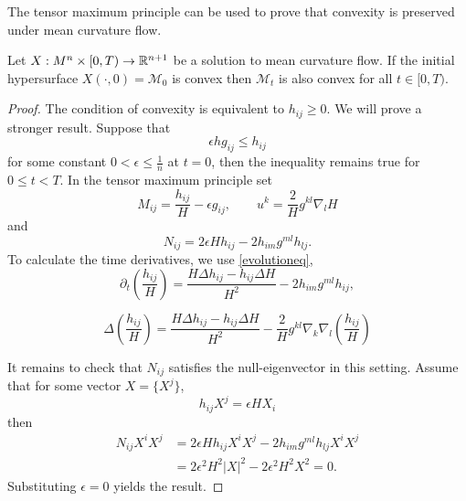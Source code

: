 The tensor maximum principle can be used to prove that convexity is preserved under mean curvature flow. 

\begin{lemma}
    Let $ X: M^{n} \times [0, T) \to \mathbb{R}^{n+1} $ be a solution to mean curvature flow. If the initial hypersurface $ X(\cdot, 0) = \mathcal{M}_{0}$ is convex then $ \mathcal{M}_{t} $ is also convex for all $ t \in [0,T) $.
\end{lemma}
\begin{proof}
    The condition of convexity is equivalent to $ h_{ij} \ge 0 $. We will prove a stronger result. Suppose that 
    \[ \epsilon h g_{ij} \le h_{ij} \]
    for some constant $ 0 < \epsilon \le \frac{1}{n} $ at $ t = 0 $, then the inequality remains true for $ 0 \le t <T $. In the tensor maximum principle set 
    \[ M_{ij} = \frac{h_{ij}}{H} - \epsilon g_{ij}, \qquad u^{k} = \frac{2}{H}g^{kl} \nabla_{l}H \]
    and 
    \[ N_{ij} = 2 \epsilon H h_{ij} - 2h_{im}g^{ml}h_{lj}. \]
    To calculate the time derivatives, we use \cref{evolutioneq}, 
    \[ \partial_{t}\left( \frac{h_{ij}}{H} \right) = \frac{H \Delta h_{ij}- h_{ij}\Delta H}{H^{2}} - 2h_{im}g^{ml}h_{ij},  \]
    
    \[ \Delta \left( \frac{h_{ij}}{H} \right)  = \frac{H \Delta h_{ij}- h_{ij} \Delta H }{H^{2}} - \frac{2}{H}g^{kl}\nabla_{k
    }\nabla_{l}( \frac{h_{ij}}{H})\]


    It remains to check that $ N_{ij} $ satisfies the null-eigenvector in this setting. Assume that for some vector $ X = \{X^{j}\} $, 
    \[ h_{ij}  X^{j} = \epsilon HX_{i} \]
    then \begin{align*}
        N_{ij}X^{i}X^{j} & = 2 \epsilon H h_{ij}X^{i}X^{j} - 2h_{im}g^{ml}h_{lj}X^{i}X^{j} \\
        & = 2 \epsilon^{2}H^{2}|X|^{2} - 2 \epsilon^{2}H^{2}X^{2} = 0. 
    \end{align*}
    Substituting $ \epsilon = 0 $ yields the result. 
\end{proof}
